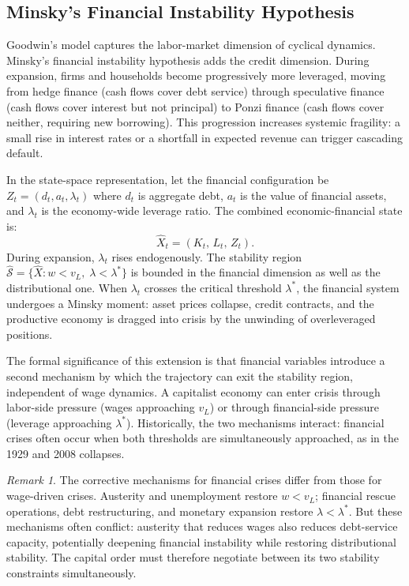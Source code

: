 \documentclass[12pt,a4paper]{article}
\theoremstyle{definition}
\theoremstyle{remark}
\newtheorem{remark}{Remark}[section]
\begin{document}
\subsection{Minsky's Financial Instability Hypothesis}

Goodwin's model captures the labor-market dimension of cyclical dynamics. Minsky's financial instability hypothesis adds the credit dimension. During expansion, firms and households become progressively more leveraged, moving from hedge finance (cash flows cover debt service) through speculative finance (cash flows cover interest but not principal) to Ponzi finance (cash flows cover neither, requiring new borrowing). This progression increases systemic fragility: a small rise in interest rates or a shortfall in expected revenue can trigger cascading default.

In the state-space representation, let the financial configuration be $Z_t = (d_t, a_t, \lambda_t)$ where $d_t$ is aggregate debt, $a_t$ is the value of financial assets, and $\lambda_t$ is the economy-wide leverage ratio. The combined economic-financial state is:
\begin{equation}
  \label{eq:financial_state}
  \hat{X}_t = (K_t,\, L_t,\, Z_t).
\end{equation}
During expansion, $\lambda_t$ rises endogenously. The stability region $\hat{\mathcal{S}} = \{\hat{X} : w < v_L,\; \lambda < \lambda^*\}$ is bounded in the financial dimension as well as the distributional one. When $\lambda_t$ crosses the critical threshold $\lambda^*$, the financial system undergoes a Minsky moment: asset prices collapse, credit contracts, and the productive economy is dragged into crisis by the unwinding of overleveraged positions.

The formal significance of this extension is that financial variables introduce a second mechanism by which the trajectory can exit the stability region, independent of wage dynamics. A capitalist economy can enter crisis through labor-side pressure (wages approaching $v_L$) or through financial-side pressure (leverage approaching $\lambda^*$). Historically, the two mechanisms interact: financial crises often occur when both thresholds are simultaneously approached, as in the 1929 and 2008 collapses.

\begin{remark}
The corrective mechanisms for financial crises differ from those for wage-driven crises. Austerity and unemployment restore $w < v_L$; financial rescue operations, debt restructuring, and monetary expansion restore $\lambda < \lambda^*$. But these mechanisms often conflict: austerity that reduces wages also reduces debt-service capacity, potentially deepening financial instability while restoring distributional stability. The capital order must therefore negotiate between its two stability constraints simultaneously.
\end{remark}
\end{document}
